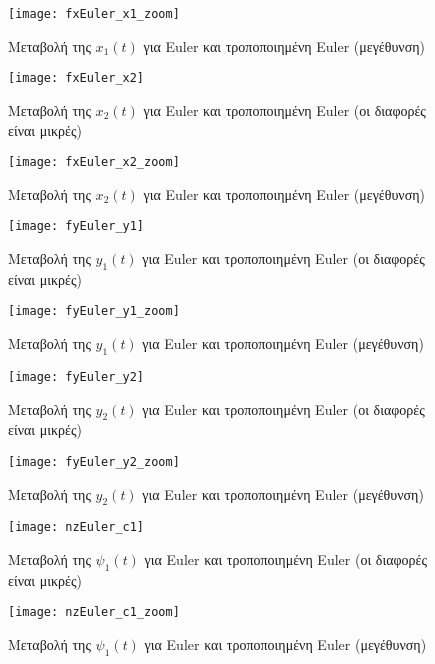 \documentclass{article}
\begin{document}
\begin{figure}[h!]
 \centering
\texttt{[image: fxEuler\_x1\_zoom]}
\caption{Μεταβολή της $x_1(t)$ για Euler και τροποποιημένη Euler (μεγέθυνση)}
\label{l_2}
\end{figure}
\clearpage

\clearpage
\begin{figure}[h!]
 \centering
\texttt{[image: fxEuler\_x2]}
\caption{Μεταβολή της $x_2(t)$ για Euler και τροποποιημένη Euler (οι διαφορές είναι μικρές)}
\end{figure}


\begin{figure}[h!]
 \centering
\texttt{[image: fxEuler\_x2\_zoom]}
\caption{Μεταβολή της $x_2(t)$ για Euler και τροποποιημένη Euler (μεγέθυνση)}
\label{l_4}
\end{figure}
\clearpage

\clearpage
\begin{figure}[h!]
 \centering
\texttt{[image: fyEuler\_y1]}
\caption{Μεταβολή της $y_1(t)$ για Euler και τροποποιημένη
 Euler (οι διαφορές είναι μικρές)}
\end{figure}

\begin{figure}[h!]
 \centering
\texttt{[image: fyEuler\_y1\_zoom]}
\caption{Μεταβολή της $y_1(t)$ για Euler και τροποποιημένη Euler (μεγέθυνση)}
\label{l_6}
\end{figure}
\clearpage

\clearpage
\begin{figure}[h!]
\centering
\texttt{[image: fyEuler\_y2]}
\caption{Μεταβολή της $y_2(t)$ για Euler και τροποποιημένη Euler (οι διαφορές είναι μικρές)}
\end{figure}


\begin{figure}[h!]
 \centering
\texttt{[image: fyEuler\_y2\_zoom]}
\caption{Μεταβολή της $y_2(t)$ για Euler και τροποποιημένη Euler (μεγέθυνση)}
\label{l_8}
\end{figure}
\clearpage

\clearpage
\begin{figure}[h!]
\texttt{[image: nzEuler\_c1]}
\caption{Μεταβολή της $\psi_1(t)$ για Euler και τροποποιημένη
 Euler (οι διαφορές είναι μικρές)}
\end{figure}

\begin{figure}[h!]
\texttt{[image: nzEuler\_c1\_zoom]}
\caption{Μεταβολή της $\psi_1(t)$ για Euler και τροποποιημένη Euler (μεγέθυνση)}
\label{l_10}
\end{figure}
\clearpage
\end{document}
